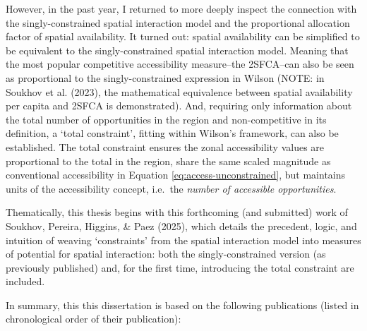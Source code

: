 \documentclass[
11pt, %
oneside, %
english, %
singlespacing, %
]{macthesis} %
\begin{document}
However, in the past year, I returned to more deeply inspect the connection with the singly-constrained spatial interaction model and the proportional allocation factor of spatial availability. It turned out: spatial availability can be simplified to be equivalent to the singly-constrained spatial interaction model. Meaning that the most popular competitive accessibility measure--the 2SFCA--can also be seen as proportional to the singly-constrained expression in Wilson (NOTE: in Soukhov et al. (2023), the mathematical equivalence between spatial availability per capita and 2SFCA is demonstrated). And, requiring only information about the total number of opportunities in the region and non-competitive in its definition, a `total constraint', fitting within Wilson's framework, can also be established. The total constraint ensures the zonal accessibility values are proportional to the total in the region, share the same scaled magnitude as conventional accessibility in Equation \ref{eq:access-unconstrained}, but maintains units of the accessibility concept, i.e.~the \emph{number of accessible opportunities}.

Thematically, this thesis begins with this forthcoming (and submitted) work of Soukhov, Pereira, Higgins, \& Paez (2025), which details the precedent, logic, and intuition of weaving `constraints' from the spatial interaction model into measures of potential for spatial interaction: both the singly-constrained version (as previously published) and, for the first time, introducing the total constraint are included.

In summary, this this dissertation is based on the following publications (listed in chronological order of their publication):
\end{document}
